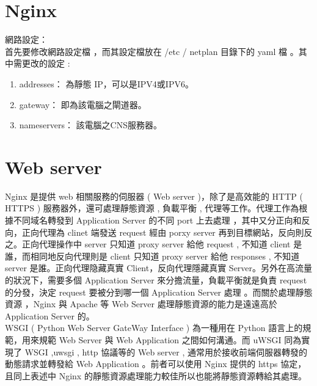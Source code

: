 \documentclass[14pt,a4paper]{report}  %
\begin{document}
\section{Nginx}
\qquad 網路設定：\\[12pt]
\qquad 首先要修改網路設定檔 ，而其設定檔放在 /etc / netplan 目錄下的 yaml 檔 。其中需更改的設定 :\\
\begin{enumerate}
\item addresses： 為靜態 IP，可以是IPV4或IPV6。
\item gateway： 即為該電腦之閘道器。
\item nameservers： 該電腦之CNS服務器。
\end{enumerate}
\section{Web server}
\qquad Nginx 是提供 web 相關服務的伺服器 ( Web server )，除了是高效能的 HTTP ( HTTPS ) 服務器外，還可處理靜態資源 , 負載平衡 , 代理等工作。代理工作為根據不同域名轉發到 Application Server 的不同 port 上去處理 ，其中又分正向和反向，正向代理為 clinet 端發送 request 經由 porxy server 再到目標網站，反向則反之。正向代理操作中 server 只知道 proxy server  給他 request , 不知道 client 是誰，而相同地反向代理則是 client 只知道 proxy server 給他 responses , 不知道 server 是誰。正向代理隐藏真實 Client，反向代理隱藏真實 Server。另外在高流量的狀況下，需要多個 Application Server 來分擔流量，負載平衡就是負責 request 的分發，決定 request 要被分到哪一個 Application Server 處理 。而關於處理靜態資源 ，Nginx 與 Apache 等 Web Server 處理靜態資源的能力是遠遠高於 Application Server 的。\\
\qquad WSGI ( Python Web Server GateWay Interface ) 為一種用在 Python 語言上的規範，用來規範 Web Server 與 Web Application 之間如何溝通。而 uWSGI 同為實現了 WSGI ,uwsgi , http 協議等的 Web server , 通常用於接收前端伺服器轉發的動態請求並轉發給 Web Application 。前者可以使用 Nginx 提供的 https 協定，且同上表述中 Nginx 的靜態資源處理能力較佳所以也能將靜態資源轉給其處理。\\
\newpage
\end{document}
